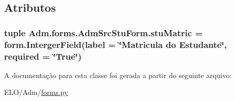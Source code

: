 \subsection{Atributos}
\hypertarget{classAdm_1_1forms_1_1AdmSrcStuForm_a0229d190c71b996fea62f558235bd588}{
\subsubsection[{stu\-Matric}]{\setlength{\rightskip}{0pt plus 5cm}tuple Adm.\-forms.\-Adm\-Src\-Stu\-Form.\-stu\-Matric = form.\-Interger\-Field(label = \char`\"{}Matricula do Estudante\char`\"{}, required = \char`\"{}True\char`\"{})\hspace{0.3cm}{\ttfamily [static]}}}\label{classAdm_1_1forms_1_1AdmSrcStuForm_a0229d190c71b996fea62f558235bd588}


A documentação para esta classe foi gerada a partir do seguinte arquivo\-:\begin{DoxyCompactItemize}
\item 
E\-L\-O/\-Adm/\hyperlink{Adm_2forms_8py}{forms.\-py}\end{DoxyCompactItemize}
